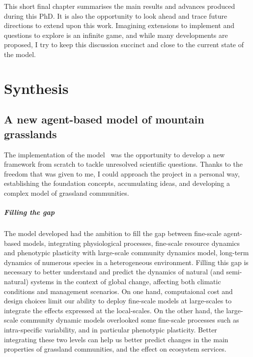 
\begin{fullwidth}
This short final chapter summarises the main results and advances produced during this PhD. It is also the opportunity to look ahead and trace future directions to extend upon this work. Imagining extensions to implement and questions to explore is an infinite game, and while many developments are proposed, I try to keep this discussion succinct and close to the current state of the model.
\end{fullwidth}

\chapter{Synthesis}
%
%
%
\section{A new agent-based model of mountain grasslands}

The implementation of the model \model ~was the opportunity to develop a new framework from scratch to tackle unresolved scientific questions. Thanks to the freedom that was given to me, I could approach the project in a personal way, establishing the foundation concepts, accumulating ideas, and developing a complex model of grassland communities.

\paragraph{Filling the gap}

The model developed had the ambition to fill the gap between fine-scale agent-based models, integrating physiological processes, fine-scale resource dynamics and phenotypic plasticity with large-scale community dynamics model, long-term dynamics of numerous species in a heterogeneous environment. Filling this gap is necessary to better understand and predict the dynamics of natural (and semi-natural) systems in the context of global change, affecting both climatic conditions and management scenarios. On one hand, computaional cost and design choices limit our ability to deploy fine-scale models at large-scales to integrate the effects expressed at the local-scales. On the other hand, the large-scale community dynamic models overlooked some fine-scale processes such as intra-specific variability, and in particular phenotypic plasticity. Better integrating these two levels can help us better predict changes in the main properties of grassland communities, and the effect on ecosystem services.

